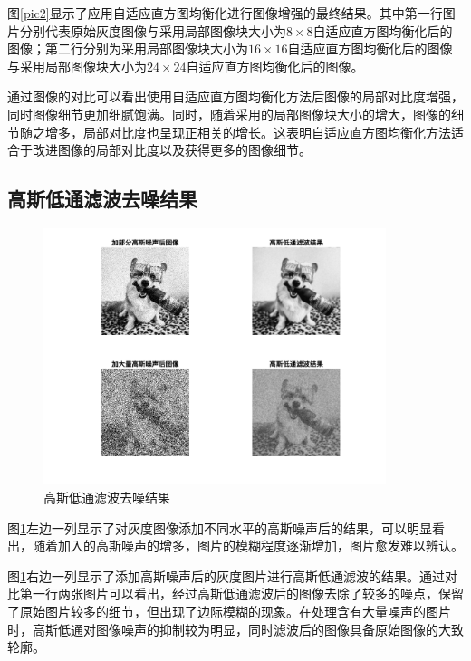 \documentclass[conference]{IEEEtran}
\begin{document}
图\ref{pic2}显示了应用自适应直方图均衡化进行图像增强的最终结果。其中第一行图片分别代表原始灰度图像与采用局部图像块大小为$8\times 8$自适应直方图均衡化后的图像；第二行分别为采用局部图像块大小为$16\times 16$自适应直方图均衡化后的图像与采用局部图像块大小为$24\times 24$自适应直方图均衡化后的图像。

通过图像的对比可以看出使用自适应直方图均衡化方法后图像的局部对比度增强，同时图像细节更加细腻饱满。同时，随着采用的局部图像块大小的增大，图像的细节随之增多，局部对比度也呈现正相关的增长。这表明自适应直方图均衡化方法适合于改进图像的局部对比度以及获得更多的图像细节。

\subsection{高斯低通滤波去噪结果}
\begin{figure}[htbp]
	\centerline{
		\includegraphics[width=10cm]{GL.png} 	
	}
	\caption{高斯低通滤波去噪结果}
	\label{pic3}
\end{figure}

图\ref{pic3}左边一列显示了对灰度图像添加不同水平的高斯噪声后的结果，可以明显看出，随着加入的高斯噪声的增多，图片的模糊程度逐渐增加，图片愈发难以辨认。

图\ref{pic3}右边一列显示了添加高斯噪声后的灰度图片进行高斯低通滤波的结果。通过对比第一行两张图片可以看出，经过高斯低通滤波后的图像去除了较多的噪点，保留了原始图片较多的细节，但出现了边际模糊的现象。在处理含有大量噪声的图片时，高斯低通对图像噪声的抑制较为明显，同时滤波后的图像具备原始图像的大致轮廓。
\end{document}

